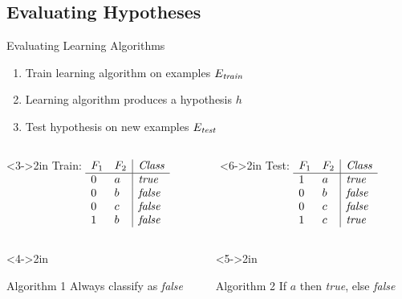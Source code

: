 \documentclass[14pt]{beamer}
\begin{document}
\subsection{Evaluating Hypotheses}

\begin{frame}{Evaluating Learning Algorithms}
\begin{enumerate}
\item Train learning algorithm on examples $E_{\textit{\scriptsize train}}$
\item Learning algorithm produces a hypothesis $h$
\item Test hypothesis on new examples $E_{\textit{\scriptsize test}}$ 
\end{enumerate}
\begin{columns}
\begin{column}<3->{2in}
Train:
$
\begin{array}[t]{ll|l}
F_1 & F_2 & \textit{Class} \\
\hline
0   & a   & \textit{true} \\
0   & b   & \textit{false} \\
0   & c   & \textit{false} \\
1   & b   & \textit{false} \\
\end{array}
$
\end{column}
\begin{column}<6->{2in}
Test:
$
\begin{array}[t]{ll|l}
F_1 & F_2 & \textit{Class} \\
\hline
1   & a   & \textit{true} \\
0   & b   & \textit{false} \\
0   & c   & \textit{false} \\
1   & c   & \textit{true} \\
\end{array}
$
\end{column}
\end{columns}
\begin{columns}
\begin{column}<4->{2in}
\begin{block}{Algorithm 1}
Always classify as \textit{false}
\\
 
\end{block}
\end{column}
\begin{column}<5->{2in}
\begin{block}{Algorithm 2}
If $a$ then \textit{true}, else \textit{false}
\\
 
\end{block}
\end{column}
\end{columns}
\end{frame}
\end{document}
